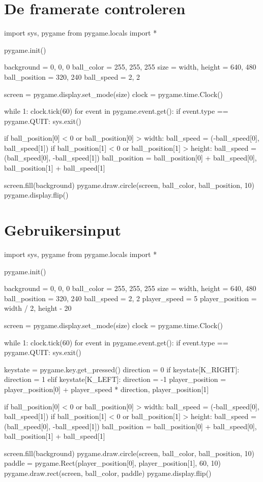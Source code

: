 \documentclass[10pt,a4paper]{article}
\begin{document}
\newpage
\section{De framerate controleren}

\begin{python}
import sys, pygame
from pygame.locals import *

pygame.init()

background = 0, 0, 0
ball_color = 255, 255, 255
size = width, height = 640, 480
ball_position = 320, 240
ball_speed = 2, 2

screen = pygame.display.set_mode(size)
clock = pygame.time.Clock()

while 1:
    clock.tick(60)
    for event in pygame.event.get():
        if event.type == pygame.QUIT: sys.exit()
    
    if ball_position[0] < 0 or ball_position[0] > width:
        ball_speed = (-ball_speed[0], ball_speed[1])
    if ball_position[1] < 0 or ball_position[1] > height:
        ball_speed = (ball_speed[0], -ball_speed[1])
    ball_position = ball_position[0] + ball_speed[0], ball_position[1] + ball_speed[1]
    
    screen.fill(background)
    pygame.draw.circle(screen, ball_color, ball_position, 10)
    pygame.display.flip()
\end{python}

\newpage
\section{Gebruikersinput}

\begin{python}
import sys, pygame
from pygame.locals import *

pygame.init()

background = 0, 0, 0
ball_color = 255, 255, 255
size = width, height = 640, 480
ball_position = 320, 240
ball_speed = 2, 2
player_speed = 5
player_position = width / 2, height - 20

screen = pygame.display.set_mode(size)
clock = pygame.time.Clock()

while 1:
    clock.tick(60)
    for event in pygame.event.get():
        if event.type == pygame.QUIT: sys.exit()
    
    keystate = pygame.key.get_pressed()
    direction = 0
    if keystate[K_RIGHT]:
        direction = 1
    elif keystate[K_LEFT]:
        direction = -1
    player_position = player_position[0] + player_speed * direction, player_position[1]

    if ball_position[0] < 0 or ball_position[0] > width:
        ball_speed = (-ball_speed[0], ball_speed[1])
    if ball_position[1] < 0 or ball_position[1] > height:
        ball_speed = (ball_speed[0], -ball_speed[1])
    ball_position = ball_position[0] + ball_speed[0], ball_position[1] + ball_speed[1]
    
    screen.fill(background)
    pygame.draw.circle(screen, ball_color, ball_position, 10)
    paddle = pygame.Rect(player_position[0], player_position[1], 60, 10)
    pygame.draw.rect(screen, ball_color, paddle)
    pygame.display.flip()
\end{python}
\end{document}
